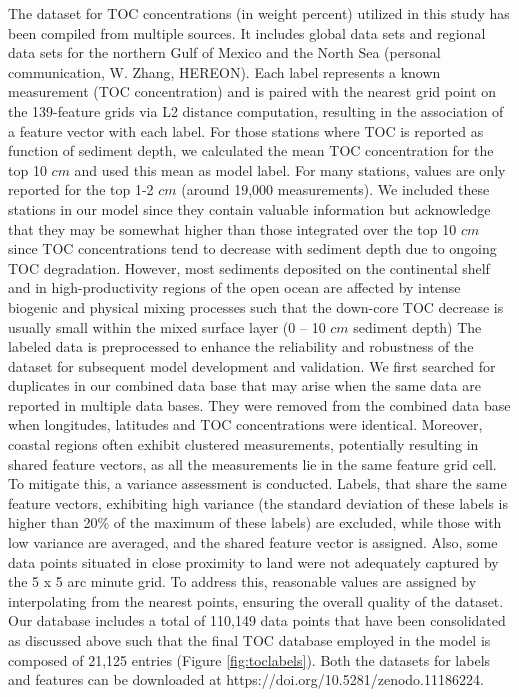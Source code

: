 \documentclass[journal abbreviation, manuscript]{copernicus}
\begin{document}
The dataset for TOC concentrations (in weight percent) utilized in this study has been compiled from multiple sources. It includes global data sets \citep{SEITER20042001, romankevich2009organic, mosaic, mosaicv2} and regional data sets for the northern Gulf of Mexico \citep{beazley2003significance} and the North Sea (personal communication, W. Zhang, HEREON). Each label represents a known measurement (TOC concentration) and is paired with the nearest grid point on the 139-feature grids via L2 distance computation, resulting in the association of a feature vector with each label. For those stations where TOC is reported as function of sediment depth, we calculated the mean TOC concentration for the top 10 $cm$ and used this mean as model label. For many stations, values are only reported for the top 1-2 $cm$ (around 19,000 measurements). We included these stations in our model since they contain valuable information but acknowledge that they may be somewhat higher than those integrated over the top 10 $cm$ since TOC concentrations tend to decrease with sediment depth due to ongoing TOC degradation. However, most sediments deposited on the continental shelf and in high-productivity regions of the open ocean are affected by intense biogenic and physical mixing processes \citep{boudreau1997diagenetic} such that the down-core TOC decrease is usually small within the mixed surface layer (0 – 10 $cm$ sediment depth) The labeled data is preprocessed to enhance the reliability and robustness of the dataset for subsequent model development and validation. We first searched for duplicates in our combined data base that may arise when the same data are reported in multiple data bases. They were removed from the combined data base when longitudes, latitudes and TOC concentrations were identical. Moreover, coastal regions often exhibit clustered measurements, potentially resulting in shared feature vectors, as all the measurements lie in the same feature grid cell. To mitigate this, a variance assessment is conducted. Labels, that share the same feature vectors, exhibiting high variance (the standard deviation of these labels is higher than 20\% of the maximum of these labels) are excluded, while those with low variance are averaged, and the shared feature vector is assigned. Also, some data points situated in close proximity to land were not adequately captured by the 5 x 5 arc minute grid. To address this, reasonable values are assigned by interpolating from the nearest points, ensuring the overall quality of the dataset. Our database includes a total of 110,149 data points that have been consolidated as discussed above such that the final TOC database employed in the model is composed of 21,125 entries
 (Figure \ref{fig:toclabels}). Both the datasets for labels and features can be downloaded at https://doi.org/10.5281/zenodo.11186224.
\end{document}
